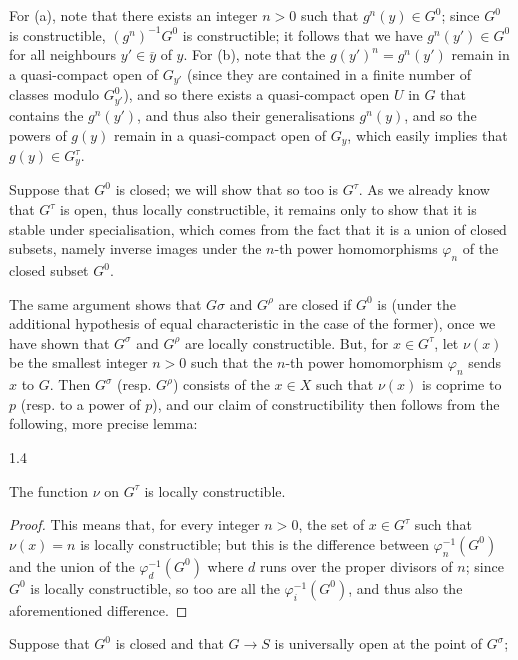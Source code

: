   For (a), note that there exists an integer \(n>0\) such that \(g^n(y)\in  G^0\); since \(G^0\) is constructible, \((g^n)^{-1}G^0\) is constructible;
  it follows that we have \(g^n(y')\in  G^0\) for all neighbours \(y'\in \overline {y}\) of \(y\).
  For (b), note that the \(g(y')^n=g^n(y')\) remain in a quasi-compact open of \(G_{y'}\) (since they are contained in a finite number of classes modulo \(G_{y'}^0\)), and so there exists a quasi-compact open \(U\) in \(G\) that contains the \(g^n(y')\), and thus also their generalisations \(g^n(y)\), and so the powers of \(g(y)\) remain in a quasi-compact open of \(G_y\), which easily implies that \(g(y)\in  G_y^\tau \).\par{}Suppose that \(G^0\) is closed;
  we will show that so too is \(G^\tau \).
  As we already know that \(G^\tau \) is open, thus locally constructible, it remains only to show that it is stable under specialisation, which comes from the fact that it is a union of closed subsets, namely inverse images under the \(n\)-th power homomorphisms \(\varphi _n\) of the closed subset \(G^0\).\par{}The same argument shows that \(G\sigma \) and \(G^\rho \) are closed if \(G^0\) is (under the additional hypothesis of equal characteristic in the case of the former), once we have shown that \(G^\sigma \) and \(G^\rho \) are locally constructible.
  But, for \(x\in  G^\tau \), let \(\nu (x)\) be the smallest integer \(n>0\) such that the \(n\)-th power homomorphism \(\varphi _n\) sends \(x\) to \(G\).
  Then \(G^\sigma \) (resp. \(G^\rho \)) consists of the \(x\in  X\) such that \(\nu (x)\) is coprime to \(p\) (resp. to a power of \(p\)), and our claim of constructibility then follows from the following, more precise lemma:\begin{lemma}{1.4}\label{fga3.vi-1-lemma-1.4}\skipsinglepar\par{}The function \(\nu \) on \(G^\tau \) is locally constructible.\begin{proof}\par{}This means that, for every integer \(n>0\), the set of \(x\in  G^\tau \) such that \(\nu (x)=n\) is locally constructible;
      but this is the difference between \(\varphi _n^{-1}(G^0)\) and the union of the \(\varphi _d^{-1}(G^0)\) where \(d\) runs over the proper divisors of \(n\);
      since \(G^0\) is locally constructible, so too are all the \(\varphi _i^{-1}(G^0)\), and thus also the aforementioned difference.\end{proof}\end{lemma}\par{}Suppose that \(G^0\) is closed and that \(G\to  S\) is universally open at the point of \(G^\sigma \);
